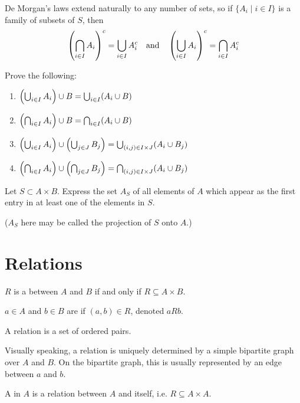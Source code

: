 De Morgan’s laws extend naturally to any number of sets, so if $\{A_i \mid i \in I\}$ is a family of subsets of $S$, then
\[ \left(\bigcap_{i\in I}A_i\right)^c = \bigcup_{i\in I}A_i^c \quad \text{and} \quad \left(\bigcup_{i\in I}A_i\right)^c = \bigcap_{i\in I}A_i^c \]

\begin{exercise}{}{}
Prove the following:
\begin{enumerate}
\item $\left(\bigcup_{i\in I}A_i\right)\cup B=\bigcup_{i\in I}(A_i\cup B)$
\item $\left(\bigcap_{i\in I}A_i\right)\cup B=\bigcap_{i\in I}(A_i\cup B)$
\item $\left(\bigcup_{i\in I}A_i\right)\cup\left(\bigcup_{j\in J}B_j\right)=\bigcup_{(i,j)\in I\times J}(A_i\cup B_j)$
\item $\left(\bigcap_{i\in I}A_i\right)\cup\left(\bigcap_{j\in J}B_j\right)=\bigcap_{(i,j)\in I\times J}(A_i\cup B_j)$
\end{enumerate}
\end{exercise}

\begin{exercise}
Let $S\subset A\times B$. Express the set $A_S$ of all elements of $A$ which appear as the first entry in at least one of the elements in $S$.

($A_S$ here may be called the projection of $S$ onto $A$.)
\end{exercise}
\pagebreak

\section{Relations}
\begin{definition}[Relation]
$R$ is a  between $A$ and $B$ if and only if $R\subseteq A\times B$.

$a \in A$ and $b \in B$ are  if $(a,b) \in R$, denoted $a R b$.
\end{definition}

\begin{remark}
A relation is a set of ordered pairs.
\end{remark}

Visually speaking, a relation is uniquely determined by a simple bipartite graph over $A$ and $B$. On the bipartite graph, this is usually represented by an edge between $a$ and $b$.

\begin{definition}
A  in $A$ is a relation between $A$ and itself, i.e. $R \subseteq A \times A$.
\end{definition}

